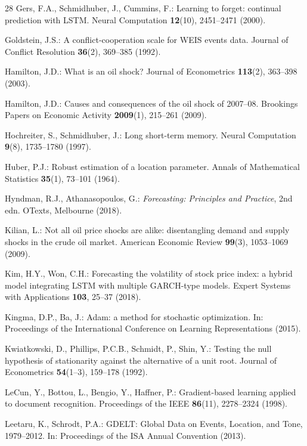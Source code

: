 \documentclass[pdflatex,sn-mathphys-num]{sn-jnl}%
\theoremstyle{thmstyleone}%
\theoremstyle{thmstyletwo}%
\theoremstyle{thmstylethree}%
\begin{document}
\begin{thebibliography}{28}
Gers, F.A., Schmidhuber, J., Cummins, F.: Learning to forget: continual prediction with LSTM. Neural Computation \textbf{12}(10), 2451--2471 (2000).

Goldstein, J.S.: A conflict-cooperation scale for WEIS events data. Journal of Conflict Resolution \textbf{36}(2), 369--385 (1992).

Hamilton, J.D.: What is an oil shock? Journal of Econometrics \textbf{113}(2), 363--398 (2003).

Hamilton, J.D.: Causes and consequences of the oil shock of 2007--08. Brookings Papers on Economic Activity \textbf{2009}(1), 215--261 (2009).

Hochreiter, S., Schmidhuber, J.: Long short-term memory. Neural Computation \textbf{9}(8), 1735--1780 (1997).

Huber, P.J.: Robust estimation of a location parameter. Annals of Mathematical Statistics \textbf{35}(1), 73--101 (1964).

Hyndman, R.J., Athanasopoulos, G.: \textit{Forecasting: Principles and Practice}, 2nd edn. OTexts, Melbourne (2018).

Kilian, L.: Not all oil price shocks are alike: disentangling demand and supply shocks in the crude oil market. American Economic Review \textbf{99}(3), 1053--1069 (2009).

Kim, H.Y., Won, C.H.: Forecasting the volatility of stock price index: a hybrid model integrating LSTM with multiple GARCH-type models. Expert Systems with Applications \textbf{103}, 25--37 (2018).

Kingma, D.P., Ba, J.: Adam: a method for stochastic optimization. In: Proceedings of the International Conference on Learning Representations (2015).

Kwiatkowski, D., Phillips, P.C.B., Schmidt, P., Shin, Y.: Testing the null hypothesis of stationarity against the alternative of a unit root. Journal of Econometrics \textbf{54}(1--3), 159--178 (1992).

LeCun, Y., Bottou, L., Bengio, Y., Haffner, P.: Gradient-based learning applied to document recognition. Proceedings of the IEEE \textbf{86}(11), 2278--2324 (1998).

Leetaru, K., Schrodt, P.A.: GDELT: Global Data on Events, Location, and Tone, 1979--2012. In: Proceedings of the ISA Annual Convention (2013).


\end{thebibliography}
\end{document}

